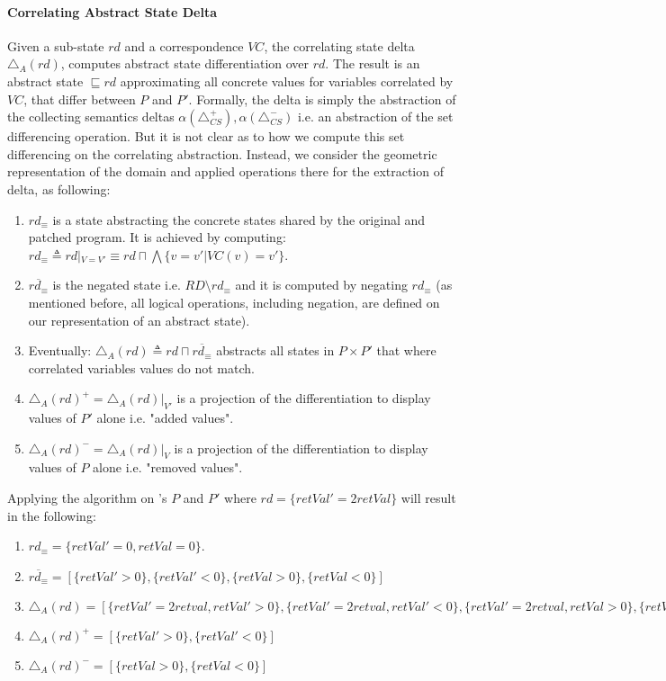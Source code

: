 \paragraph{Correlating Abstract State Delta} 
Given a sub-state $rd$ and a correspondence $VC$, the correlating state delta $\triangle_{A}(rd)$, computes abstract state differentiation over $rd$. The result is an abstract state $\sqsubseteq rd$ approximating all concrete values for variables correlated by $VC$, that differ between $P$ and $P'$. Formally, the delta is simply the abstraction of the collecting semantics deltas $\alpha(\triangle_{CS}^{+}), \alpha(\triangle_{CS}^{-})$ i.e. an abstraction of the set differencing operation. But it is not clear as to how we compute this set differencing on the correlating abstraction. Instead, we consider the geometric representation of the domain and applied operations there for the extraction of delta, as following:
\begin{enumerate}
\item $rd_{\equiv}$ is a state abstracting the concrete states shared by the original and patched program. It is achieved by computing: $rd_{\equiv} \triangleq rd|_{V=V'} \equiv rd \sqcap \bigwedge\{ v = v' | VC(v) = v'\}$.
\item $\overline{rd_{\equiv}}$ is the negated state i.e. $RD \setminus rd_{\equiv}$ and it is computed by negating $rd_{\equiv}$ (as mentioned before, all logical operations, including negation, are defined on our representation of an abstract state).
\item Eventually: $\triangle_{A}(rd) \triangleq rd \sqcap \overline{rd_{\equiv}}$ abstracts all states in $P \times P'$ that where correlated variables values do not match.
\item $\triangle_{A}(rd)^{+} = \triangle_{A}(rd)|_{V'}$ is a projection of the differentiation to display values of $P'$ alone i.e. "added values".
\item $\triangle_{A}(rd)^{-} = \triangle_{A}(rd)|_{V}$ is a projection of the differentiation to display values of $P$ alone i.e. "removed values".
\end{enumerate}
Applying the algorithm on 's $P$ and $P'$ where $rd = \{ retVal' = 2retVal \}$ will result in the following:
\begin{enumerate}
\item $rd_{\equiv} = \{ retVal' = 0, retVal = 0 \}$.
\item $\overline{rd_{\equiv}} = [ \{ retVal' > 0 \}, \{ retVal' < 0 \}, \{ retVal > 0 \}, \{ retVal < 0 \} ]$
\item $\triangle_{A}(rd)  = [ \{ retVal' = 2retval, retVal' > 0 \}, \{ retVal' = 2retval, retVal' < 0 \}, \{ retVal' = 2retval, retVal > 0 \}, \{ retVal' = 2retval, retVal < 0 \} ]$
\item $\triangle_{A}(rd)^{+} = [ \{ retVal' > 0 \}, \{ retVal' < 0 \} ]$
\item $\triangle_{A}(rd)^{-} = [\{ retVal > 0 \}, \{ retVal < 0 \}]$
\end{enumerate}
